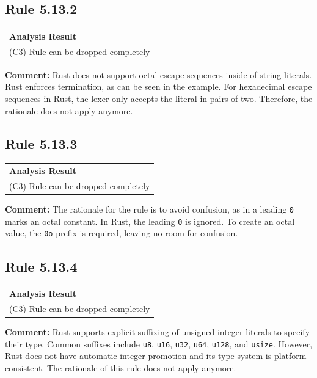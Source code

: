 \subsection*{Rule 5.13.2}
\begin{longtable}{p{13cm}}
\textbf{Analysis Result} \\
(C3) Rule can be dropped completely \\
\end{longtable}
\textbf{Comment:} Rust does not support octal escape sequences inside of string literals. Rust enforces termination, as can be seen in the example. For hexadecimal escape sequences in Rust, the lexer only accepts the literal in pairs of two. Therefore, the rationale does not apply anymore. \\


\subsection*{Rule 5.13.3}
\begin{longtable}{p{13cm}}
\textbf{Analysis Result} \\
(C3) Rule can be dropped completely \\
\end{longtable}
\textbf{Comment:} The rationale for the rule is to avoid confusion, as in \Cpp a leading \texttt{0} marks an octal constant. In Rust, the leading \texttt{0} is ignored. To create an octal value, the \texttt{0o} prefix is required, leaving no room for confusion. \\


\subsection*{Rule 5.13.4}
\begin{longtable}{p{13cm}}
\textbf{Analysis Result} \\
(C3) Rule can be dropped completely \\
\end{longtable}
\textbf{Comment:} Rust supports explicit suffixing of unsigned integer literals to specify their type. Common suffixes include \texttt{u8}, \texttt{u16}, \texttt{u32}, \texttt{u64}, \texttt{u128}, and \texttt{usize}. However, Rust does not have automatic integer promotion and its type system is platform-consistent. The rationale of this rule does not apply anymore. \\


